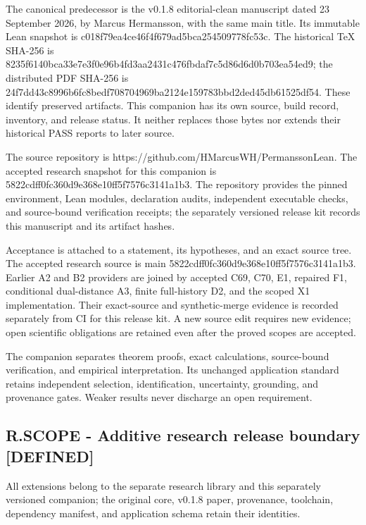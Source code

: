 \documentclass[11pt,a4paper]{article}
\begin{document}
The canonical predecessor is the v0.1.8 editorial-clean manuscript dated 23 September 2026, by Marcus Hermansson, with the same main title. Its immutable Lean snapshot is c018f79ea4ce\allowbreak{}46f4f679ad5b\allowbreak{}ca254509778f\allowbreak{}c53c. The historical TeX SHA-256 is 8235f6140bca\allowbreak{}33e7e3f0e96b\allowbreak{}4fd3aa2431c4\allowbreak{}76fbdaf7c5d8\allowbreak{}6d6d0b703ea5\allowbreak{}4ed9; the distributed PDF SHA-256 is 24f7dd43c899\allowbreak{}6b6fc8bedf70\allowbreak{}8704969ba212\allowbreak{}4e159783bbd2\allowbreak{}ded45db61525\allowbreak{}df54. These identify preserved artifacts. This companion has its own source, build record, inventory, and release status. It neither replaces those bytes nor extends their historical PASS reports to later source.

The source repository is https://gith\allowbreak{}ub.com/HMarc\allowbreak{}usWH/Permans\allowbreak{}sonLean. The accepted research snapshot for this companion is 5822cdff0fc3\allowbreak{}60d9e368e10f\allowbreak{}f5f7576c3141\allowbreak{}a1b3. The repository provides the pinned environment, Lean modules, declaration audits, independent executable checks, and source-bound verification receipts; the separately versioned release kit records this manuscript and its artifact hashes.

Acceptance is attached to a statement, its hypotheses, and an exact source tree. The accepted research source is main 5822cdff0fc3\allowbreak{}60d9e368e10f\allowbreak{}f5f7576c3141\allowbreak{}a1b3. Earlier A2 and B2 providers are joined by accepted C69, C70, E1, repaired F1, conditional dual-distance A3, finite full-history D2, and the scoped X1 implementation. Their exact-source and synthetic-merge evidence is recorded separately from CI for this release kit. A new source edit requires new evidence; open scientific obligations are retained even after the proved scopes are accepted.

The companion separates theorem proofs, exact calculations, source-bound verification, and empirical interpretation. Its unchanged application standard retains independent selection, identification, uncertainty, grounding, and provenance gates. Weaker results never discharge an open requirement.

\subsection*{R.SCOPE - Additive research release boundary [DEFINED]}
All extensions belong to the separate research library and this separately versioned companion; the original core, v0.1.8 paper, provenance, toolchain, dependency manifest, and application schema retain their identities.
\end{document}
